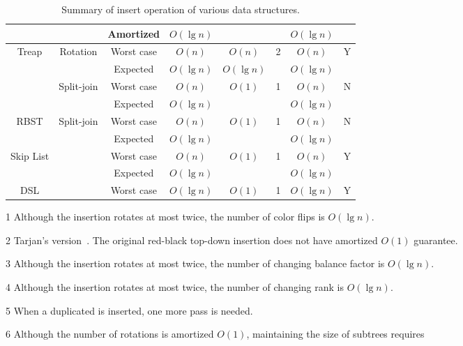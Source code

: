 \begin{table}[!t]
\begin{threeparttable}
\begin{tabular}{cccccccc}
  & & Amortized & $O(\lg n)$ & & & $O(\lg n)$ & \\
  \hline
  \multirow{4}{*}{Treap} & \multirow{2}{*}{Rotation} & Worst case & $O(n)$ & $O(n)$ & \multirow{2}{*}{2} & $O(n)$ & \multirow{2}{*}{Y} \\
  & & Expected & $O(\lg n)$ & $O(\lg n)$ & & $O(\lg n)$ & \\
  & \multirow{2}{*}{Split-join} & Worst case & $O(n)$ & \multirow{2}{*}{$O(1)$} & \multirow{2}{*}{1} & $O(n)$ & \multirow{2}{*}{N} \\
  & & Expected & $O(\lg n)$ & & & $O(\lg n)$ & \\
  \hline
  \multirow{2}{*}{RBST} & \multirow{2}{*}{Split-join}& Worst case & $O(n)$ & \multirow{2}{*}{$O(1)$} & \multirow{2}{*}{1} & $O(n)$ & \multirow{2}{*}{N} \\
  & & Expected & $O(\lg n)$ &  & & $O(\lg n)$ & \\
  \hline
  \multirow{2}{*}{Skip List} & & Worst case & $O(n)$ & \multirow{2}{*}{$O(1)$} & \multirow{2}{*}{1} & $O(n)$ & \multirow{2}{*}{Y} \\
  & & Expected & $O(\lg n)$ & & & $O(\lg n)$ & \\
  \hline
  DSL & & Worst case & $O(\lg n)$ & $O(1)$ & 1 & $O(\lg n)$ & Y \\
\end{tabular}
\begin{tablenotes}\footnotesize
\item[1] Although the insertion rotates at most twice, the number of color flips is $O(\lg n)$.
\item[2] Tarjan's version~\cite{Tarjan1985}. The original red-black top-down insertion does not have amortized $O(1)$ guarantee.
\item[3] Although the insertion rotates at most twice, the number of changing balance factor is $O(\lg n)$.
\item[4] Although the insertion rotates at most twice, the number of changing rank is $O(\lg n)$.
\item[5] When a duplicated is inserted, one more pass is needed.
\item[6] Although the number of rotations is amortized $O(1)$, maintaining the size of subtrees requires
\end{tablenotes}
\caption{Summary of insert operation of various data structures.}\label{insert}
\end{threeparttable}
\end{table}

